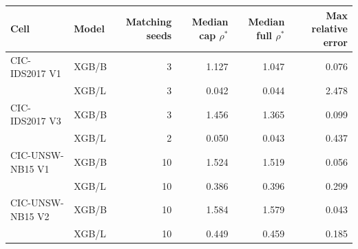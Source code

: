 \begin{tabular}{@{}llrrrr@{}}
\toprule
Cell & Model & Matching seeds & Median cap $\rho^*$ & Median full $\rho^*$ & Max relative error \\
\midrule
CIC-IDS2017 V1 & XGB/B & 3 & 1.127 & 1.047 & 0.076 \\
 & XGB/L & 3 & 0.042 & 0.044 & 2.478 \\
\addlinespace
CIC-IDS2017 V3 & XGB/B & 3 & 1.456 & 1.365 & 0.099 \\
 & XGB/L & 2 & 0.050 & 0.043 & 0.437 \\
\addlinespace
CIC-UNSW-NB15 V1 & XGB/B & 10 & 1.524 & 1.519 & 0.056 \\
 & XGB/L & 10 & 0.386 & 0.396 & 0.299 \\
\addlinespace
CIC-UNSW-NB15 V2 & XGB/B & 10 & 1.584 & 1.579 & 0.043 \\
 & XGB/L & 10 & 0.449 & 0.459 & 0.185 \\
\bottomrule
\end{tabular}
